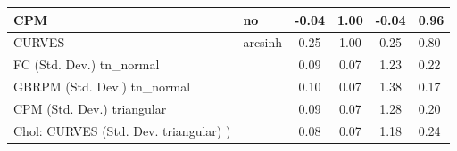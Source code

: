 \begin{table}
\begin{center}
\begin{tabular}{|l|l|c|c|c|l|}
			\hline
			CPM & no & -0.04 & 1.00 & -0.04 & 0.96 \\
			\hline
			CURVES & arcsinh & 0.25 & 1.00 & 0.25 & 0.80 \\
			\hline
			FC (Std. Dev.) tn_normal &  & 0.09 & 0.07 & 1.23 & 0.22 \\
			\hline
			GBRPM (Std. Dev.) tn_normal &  & 0.10 & 0.07 & 1.38 & 0.17 \\
			\hline
			CPM (Std. Dev.) triangular &  & 0.09 & 0.07 & 1.28 & 0.20 \\
			\hline
			 Chol: CURVES (Std. Dev. triangular) ) &  & 0.08 & 0.07 & 1.18 & 0.24 \\
			\hline
		\end{tabular}
	\end{center}
\end{table}